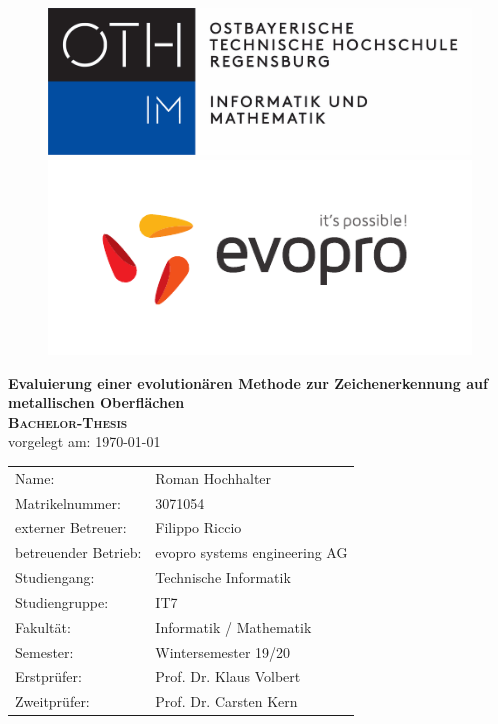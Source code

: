 \begin{titlepage}
		\begin{figure}%
			\begin{minipage}{0.48\textwidth}
				
				\includegraphics[width=0.6\linewidth]{oth-regensburg-logo}
			\end{minipage}
			\hfill
			\begin{minipage}{0.48\textwidth}
				\flushright
				\includegraphics[width=0.5\linewidth]{evopro_logo_cmyk}
			\end{minipage}
		\end{figure}
		\vspace*{1cm}
		\begin{center}
			\huge \textbf{\textsf{Evaluierung einer evolutionären Methode zur 
			Zeichenerkennung auf metallischen Oberflächen}} \\
			\vspace{4cm}
			\huge\textbf{\textsc{Bachelor-Thesis}} \\
			\vspace{1cm}
			\normalsize{vorgelegt am: \today} \\
			\vspace{3cm}
			\normalsize{
				\begin{tabular}{ll}
					Name: & {Roman Hochhalter} \\
					Matrikelnummer: & {3071054} \\
					externer Betreuer: & Filippo Riccio \\
					betreuender Betrieb: & evopro systems engineering AG \\
					Studiengang: & Technische Informatik \\
					Studiengruppe: & IT7 \\
					Fakultät: & Informatik / Mathematik \\
					Semester: & Wintersemester 19/20 \\
					Erstprüfer: & {Prof. Dr. Klaus Volbert} \\
					Zweitprüfer: & {Prof. Dr. Carsten Kern} \\
				\end{tabular}
			}
		\end{center}
\end{titlepage}

\cleardoublepage